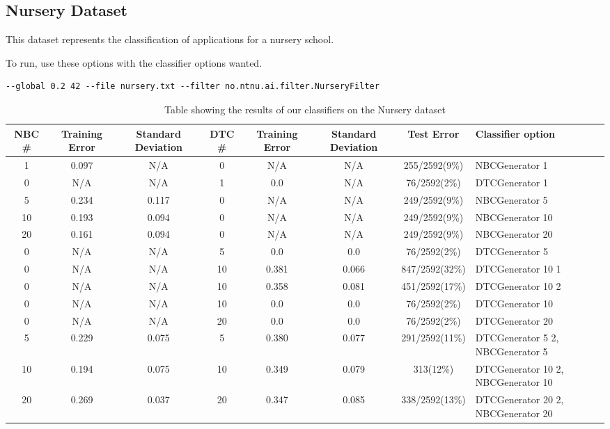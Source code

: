 \subsection{Nursery Dataset}\label{nursery dataset}
This dataset represents the classification of applications for a nursery school.

To run, use these options with the classifier options wanted.

\begin{lstlisting}[label=lst:nursery, caption=Nursery dataset general options]
--global 0.2 42 --file nursery.txt --filter no.ntnu.ai.filter.NurseryFilter
\end{lstlisting}

\begin{landscape}
\begin{table}
\begin{tabular}{|c|c|c||c|c|c||c||p{5cm}|}
\hline
NBC \# & Training Error & Standard Deviation & DTC \# & Training Error
& Standard Deviation & Test Error & Classifier option \\ \hline
1 & 0.097 & N/A & 0 & N/A & N/A & 255/2592(9\%) & NBCGenerator 1 \\ \hline
0 & N/A & N/A & 1 & 0.0 & N/A & 76/2592(2\%) & DTCGenerator 1 \\ \hline
5 & 0.234 & 0.117 & 0 & N/A & N/A & 249/2592(9\%) & NBCGenerator 5 \\ \hline
10 & 0.193 & 0.094 & 0 & N/A & N/A & 249/2592(9\%) & NBCGenerator 10 \\ \hline
20 & 0.161 & 0.094 & 0 & N/A & N/A & 249/2592(9\%) & NBCGenerator 20 \\ \hline
0 & N/A & N/A & 5 & 0.0 & 0.0 & 76/2592(2\%) & DTCGenerator 5 \\ \hline
0 & N/A & N/A & 10 & 0.381 & 0.066 & 847/2592(32\%) & DTCGenerator 10 1 \\ \hline
0 & N/A & N/A & 10 & 0.358 & 0.081 & 451/2592(17\%) & DTCGenerator 10 2 \\ \hline
0 & N/A & N/A & 10 & 0.0 & 0.0 & 76/2592(2\%) & DTCGenerator 10 \\ \hline
0 & N/A & N/A & 20 & 0.0 & 0.0 & 76/2592(2\%) & DTCGenerator 20 \\ \hline
5 & 0.229 & 0.075 & 5 & 0.380 & 0.077 & 291/2592(11\%) & DTCGenerator 5 2, 
\newline NBCGenerator 5 \\ \hline
10 & 0.194 & 0.075 & 10 & 0.349 & 0.079 & 313(12\%) & DTCGenerator 10 2, 
\newline NBCGenerator 10 \\ \hline
20 & 0.269 & 0.037 & 20 & 0.347 & 0.085 & 338/2592(13\%) & DTCGenerator 20 2, 
\newline NBCGenerator 20 \\ \hline
\hline
\end{tabular}
\label{tab:nursery}
\caption{Table showing the results of our classifiers on the Nursery dataset}
\end{table}
\end{landscape}
